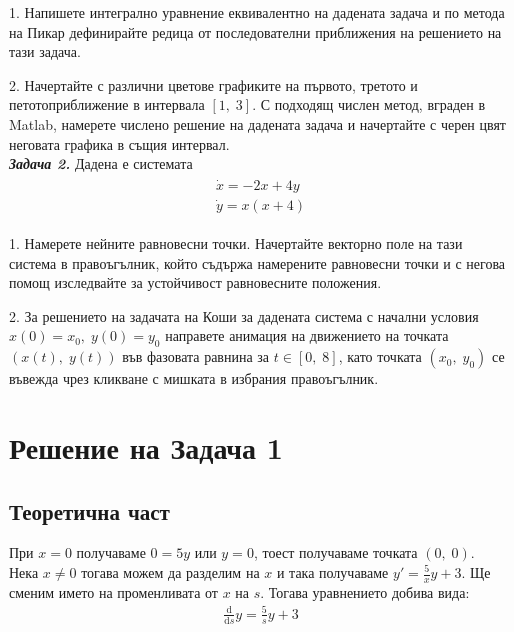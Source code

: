 \documentclass[a4paper, 12pt]{article}
\begin{document}
1. Напишете интегрално уравнение еквивалентно
на дадената задача и по метода на Пикар дефинирайте
редица от последователни приближения на решението
на тази задача.


2. Начертайте с различни цветове графиките на
първото, третото и петотоприближение в интервала $[1, \; 3]$.
С подходящ числен метод, вграден в Matlab, намерете
числено решение на дадената задача и начертайте с 
черен цвят неговата графика в същия интервал. \\


\textbf{\textit{Задача 2.}} Дадена е системата
\begin{align*} 
    \begin{array}{|l}
        \dot{x} = -2x + 4y \\
        \dot{y} = x(x + 4)    
    \end{array}
\end{align*}


1. Намерете нейните равновесни точки. Начертайте
векторно поле на тази система в правоъгълник, който
съдържа намерените равновесни точки и с негова
помощ изследвайте за устойчивост равновесните положения.


2. За решението на задачата на Коши за дадената система
с начални условия $x(0) = x_0, \; y(0) = y_0$ направете
анимация на движението на точката $(x(t), \; y(t))$
във фазовата равнина за $t \in [0, \; 8]$, като точката
$(x_0, \; y_0)$ се въвежда чрез кликване с мишката
в избрания правоъгълник.

\pagebreak

\section{Решение на Задача 1}

\subsection{Теоретична част}

При $x = 0$ получаваме $0 = 5y$ или $y = 0$,
тоест получаваме точката $(0, \; 0)$. \\


Нека $x \neq 0$ тогава можем да разделим на $x$
и така получаваме $y' = \frac{5}{x}y + 3$.
Ще сменим името на променливата от $x$ на $s$.
Тогава уравнението добива вида:
\begin{align*}
    \frac{\mathrm d}{\mathrm d s}y = \frac{5}{s}y + 3
\end{align*}
\end{document}
